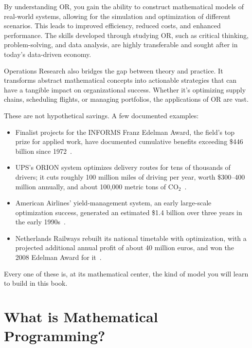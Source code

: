 By understanding OR, you gain the ability to construct mathematical models of real-world systems, allowing for the simulation and optimization of different scenarios. This leads to improved efficiency, reduced costs, and enhanced performance. The skills developed through studying OR, such as critical thinking, problem-solving, and data analysis, are highly transferable and sought after in today's data-driven economy.

Operations Research also bridges the gap between theory and practice. It transforms abstract mathematical concepts into actionable strategies that can have a tangible impact on organizational success. Whether it's optimizing supply chains, scheduling flights, or managing portfolios, the applications of OR are vast.

\begin{tcolorbox}[colback=green!4!white, colframe=green!45!black,
  title=\textbf{What is optimization worth?}]
These are not hypothetical savings.  A few documented examples:
\begin{itemize}
\item Finalist projects for the INFORMS Franz Edelman Award, the field's top prize for applied work, have documented cumulative benefits exceeding \$446 billion since 1972~\cite{informs2026edelman}.
\item UPS's ORION system optimizes delivery routes for tens of thousands of drivers; it cuts roughly 100 million miles of driving per year, worth \$300--400 million annually, and about 100{,}000 metric tons of CO$_2$~\cite{holland2017ups}.
\item American Airlines' yield-management system, an early large-scale optimization success, generated an estimated \$1.4 billion over three years in the early 1990s~\cite{smith1992yield}.
\item Netherlands Railways rebuilt its national timetable with optimization, with a projected additional annual profit of about 40 million euros, and won the 2008 Edelman Award for it~\cite{kroon2009dutch}.
\end{itemize}
Every one of these is, at its mathematical center, the kind of model you will learn to build in this book.
\end{tcolorbox}

\section{What is Mathematical Programming?}
\label{sec:what-is-MP}

